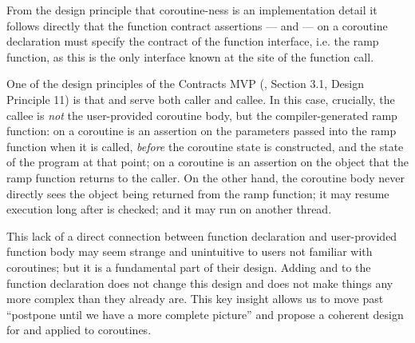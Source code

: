 From the design principle that coroutine-ness is an implementation detail it follows directly that the function contract assertions ---  and  --- on a coroutine declaration must specify the contract of the function interface, i.e. the ramp function, as this is the only interface known at the site of the function call.

One of the design principles of the Contracts MVP (\cite{P2900R8}, Section 3.1, Design Principle 11) is that  and  serve both caller and callee. In this case, crucially, the callee is \emph{not} the user-provided coroutine body, but the compiler-generated ramp function:  on a coroutine is an assertion on the parameters passed into the ramp function when it is called, \emph{before} the coroutine state is constructed, and the state of the program at that point;  on a coroutine is an assertion on the object that the ramp function returns to the caller. On the other hand, the coroutine body never directly sees the object being returned from the ramp function; it may resume execution long after  is checked; and it may run on another thread.

This lack of a direct connection between function declaration and user-provided function body may seem strange and unintuitive to users not familiar with coroutines; but it is a fundamental part of their design. Adding  and  to the function declaration does not change this design and does not make things any more complex than they already are. This key insight allows us to move past ``postpone until we have a more complete picture'' and propose a coherent design for  and  applied to coroutines.

